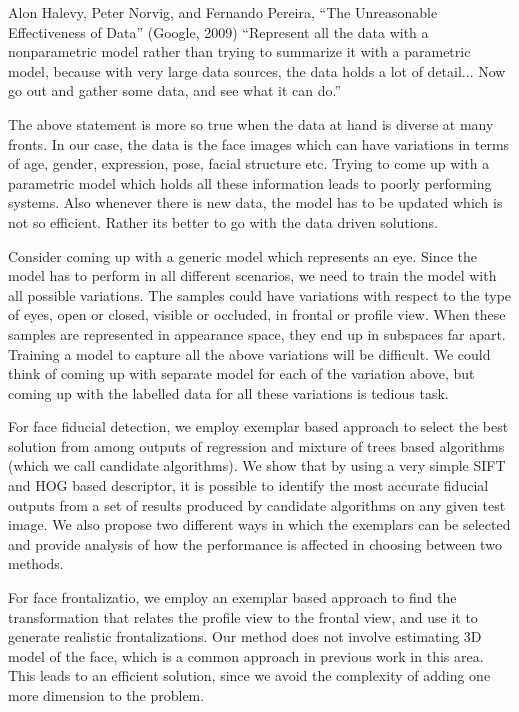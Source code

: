 
\begin{chapquote}{
Alon Halevy, Peter Norvig, and Fernando Pereira,
“The Unreasonable Effectiveness of Data” (Google, 2009)
}
“Represent all the data with a nonparametric model rather than trying to
summarize it with a parametric model, because with very large data sources, the
data holds a lot of detail... Now go out and gather some data, and see what it can
do.”
\end{chapquote}

The above statement is more so true when the data at hand is diverse at many fronts. In our case, 
the data is the face images which can have variations in terms of age, gender, expression, pose, 
facial structure etc. Trying to come up with a parametric model which holds all these information
leads to poorly performing systems. Also whenever there is new data, the model has to be updated
which is not so efficient. Rather its better to go with the data driven solutions.

Consider coming up with a generic model which represents an eye. Since the model has to perform
in all different scenarios, we need to train the model with all possible variations. The samples
could have variations with respect to the type of eyes, open or closed, visible or occluded, in 
frontal or profile view. When these samples are represented in appearance space, they end up in 
subspaces far apart. Training a model to capture all the above variations will be difficult. We
could think of coming up with separate model for each of the variation above, but coming up with 
the labelled data for all these variations is tedious task. 

For face fiducial detection, we employ exemplar based approach to select the best solution 
from among outputs of regression and mixture of trees based algorithms (which we call candidate 
algorithms). We show that by using a very simple SIFT and HOG based descriptor, it is possible to 
identify the most accurate fiducial outputs from a set of results produced by candidate algorithms 
on any given test image. We also propose two different ways in which the exemplars can be selected
and provide analysis of how the performance is affected in choosing between two methods.

For face frontalizatio, we employ an exemplar based approach to find the transformation that relates 
the profile view to the frontal view, and use it to generate realistic frontalizations. Our method 
does not involve estimating 3D model of the face, which is a common approach in previous work in 
this area. This leads to an efficient solution, since we avoid the complexity of adding one more 
dimension to the problem. 
